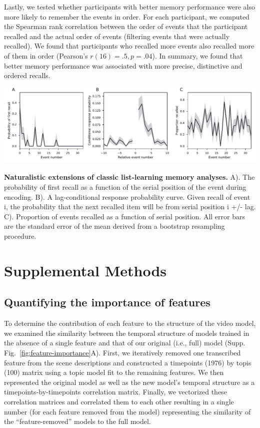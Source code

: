 \documentclass{article}
\begin{document}
Lastly, we tested whether participants with better memory performance were also more likely to remember the events in order.  For each participant, we computed the Spearman rank correlation between the order of events that the participant recalled and the actual order of events (filtering events that were actually recalled).  We found that participants who recalled more events also recalled more of them in order (Pearson's $r(16)=.5, p=.04$). In summary, we found that better memory performance was associated with more precise, distinctive and ordered recalls.

\begin{suppfigure}[t!]
\centering
\includegraphics[width=1\textwidth]{figs/supp3_list_learning.pdf}
\caption{\small \textbf{Naturalistic extensions of classic list-learning memory analyses.} A). The probability of first recall as a function of the serial position of the event during encoding. B). A lag-conditional response probability curve. Given recall of event i, the probability that the next recalled item will be from serial position i +/- lag. C). Proportion of events recalled as a function of serial position. All error bars are the standard error of the mean derived from a bootstrap resampling procedure.}
\label{fig:list-learning}
\end{suppfigure}

\section*{Supplemental Methods}
\subsection*{Quantifying the importance of features}
To determine the contribution of each feature to the structure of the video model, we examined the similarity between the temporal structure of models trained in the absence of a single feature and that of our original (i.e., full) model (Supp. Fig.~\ref{fig:feature-importance}A). First, we iteratively removed one transcribed feature from the scene descriptions and constructed a timepoints (1976) by topis (100) matrix using a topic model fit to the remaining features. We then represented the original model as well as the new model’s temporal structure as a timepoints-by-timepoints correlation matrix. Finally, we vectorized these correlation matrices and correlated them to each other resulting in a single number (for each feature removed from the model) representing the similarity of the ``feature-removed'' models to the full model.
\end{document}
